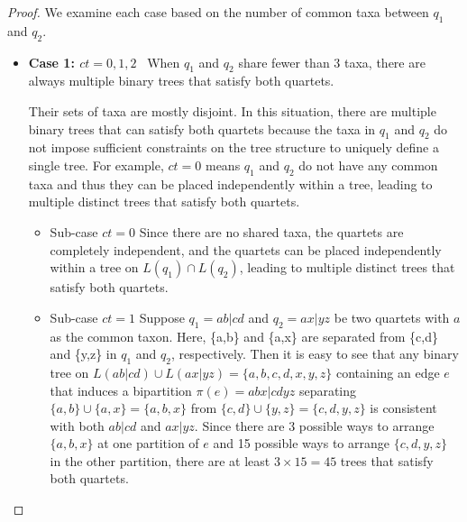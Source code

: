 \documentclass[10pt,a4paper]{article}
\newcommand{\add}[1]{{\color{blue} #1}}
\begin{document}
\begin{proof}


We examine each case based on the number of common taxa between $q_1$ and $q_2$.


\begin{itemize}
    \item \textbf{Case 1: $ct = 0, 1, 2$} \ When $q_1$ and $q_2$ share fewer than 3 taxa, there are always multiple binary trees that satisfy both quartets.


Their sets of taxa are mostly disjoint. In this situation, there are multiple binary trees that can satisfy both quartets because the taxa in $q_1$ and $q_2$ do not impose sufficient constraints on the tree structure to uniquely define a single tree. For example, $ct=0$ means $q_1$ and $q_2$ do not have any common taxa and thus they can be placed independently within a tree, leading to multiple distinct trees that satisfy both quartets. 

\begin{itemize}
    \item Sub-case $ct = 0$  Since there are no shared taxa, the quartets are completely independent, and the quartets can be placed independently within a tree on $L(q_1) \cap L(q_2)$, leading to multiple distinct trees that satisfy both quartets.

    \item Sub-case $ct = 1$ Suppose $q_1 = ab|cd$ and $q_2 = ax|yz$ be two quartets with $a$ as the common taxon. Here, \{a,b\} and \{a,x\} are separated from \{c,d\} and \{y,z\} in $q_1$ and $q_2$, respectively. Then it is easy to see that any binary tree on $L(ab|cd) \cup L(ax|yz) = \{a,b,c,d,x,y,z\}$ containing an edge $e$ that induces a bipartition $\pi(e) = abx|cdyz$ separating $\{a,b\} \cup \{a,x\} = \{a,b,x\}$ from $\{c,d\} \cup \{y,z\} = \{c,d,y,z\}$ is consistent with both $ab|cd$ and $ax|yz$. Since there are 3 possible ways to arrange $\{a,b,x\}$ at one partition of $e$ and 15 possible ways to arrange $\{c,d,y,z\}$ in the other partition, there are at least $3 \times 15 = 45$ trees that satisfy both quartets.


\end{itemize}
\end{itemize}
\end{proof}
\end{document}
